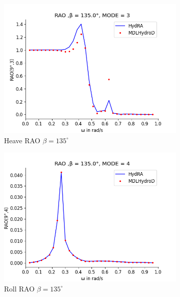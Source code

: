 \begin{figure}[H]
\begin{subfigure}[b]{0.49\textwidth}
        \includegraphics[width=\textwidth]{plots/kvlcc/rao2/rao3.png}
        \caption{Heave RAO $\beta = 135^{\circ}$}
    \end{subfigure}
    \begin{subfigure}[b]{0.49\textwidth}
        \includegraphics[width=\textwidth]{plots/kvlcc/rao2/rao4.png}
        \caption{Roll RAO $\beta = 135^{\circ}$}
    \end{subfigure}
    \vspace{5pt}%
    \begin{subfigure}[b]{0.49\textwidth}

\end{subfigure}
\end{figure}
